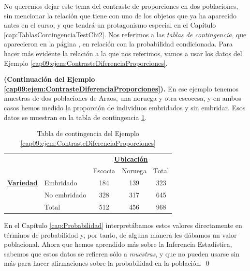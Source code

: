 No queremos dejar este tema del contraste de proporciones en dos poblaciones, sin mencionar la relación que tiene con uno de los objetos que ya ha aparecido antes en el curso, y que tendrá un protagonismo especial en el Capítulo \ref{cap:TablasContingenciaTestChi2}. Nos referimos a las {\em tablas de contingencia}, que aparecieron en la página \pageref{cap03:subsubsec:TablasContingenciaProbabilidadCondicionada}, en relación con la probabilidad condicionada. Para hacer más  evidente la relación a la que nos referimos, vamos a usar los datos del Ejemplo \ref{cap09:ejem:ContrasteDiferenciaProporciones}.
\begin{ejemplo}{\bf (Continuación del Ejemplo \ref{cap09:ejem:ContrasteDiferenciaProporciones}).}
\label{cap09:ejem:ContrasteDiferenciaProporciones2}
En ese ejemplo tenemos muestras de dos poblaciones de Araos, una noruega y otra escocesa, y en
ambos casos hemos medido la proporción de individuos embridados y sin embridar. Esos datos se
muestran en la tabla de contingencia \ref{cap09:tabla:ContingenciaContrasteDosProporciones}.
        \begin{table}[h!]
        \begin{center}
            \begin{tabular}{llccc}
            &&\multicolumn{3}{c}{\underline{\bf Ubicación}}\\

                                      &          & Escocia &  Noruega & Total\\
            \hline
          \underline{\bf Variedad} & Embridado & 184&  139&   323\\
                                      & No embridado &  328 & 317&  645\\
            \hline
                                      & Total    & 512& 456& 968\\
            \hline
            \end{tabular}
        \end{center}
        \caption{Tabla de contingencia del Ejemplo \ref{cap09:ejem:ContrasteDiferenciaProporciones}}
        \label{cap09:tabla:ContingenciaContrasteDosProporciones}
        \end{table}
En el Capítulo \ref{cap:Probabilidad} interpretábamos estos valores directamente en términos de probabilidad y, por tanto, de alguna manera les dábamos un valor poblacional. Ahora que hemos aprendido más sobre la Inferencia Estadística, sabemos que estos datos se refieren sólo a {\em muestras}, y que no pueden usarse sin más para hacer afirmaciones sobre la probabilidad en la población.
\qed
\end{ejemplo}

